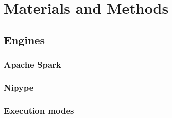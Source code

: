 \documentclass{IEEEtran}
\begin{document}






\section{Materials and Methods} %


\subsection{Engines} %

\subsubsection{Apache Spark}



\subsubsection{Nipype}


\subsubsection{Execution modes} %
\end{document}
